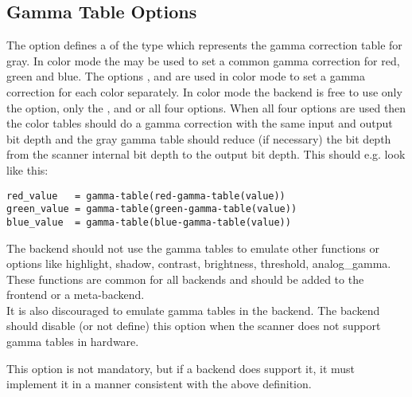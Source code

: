 \documentclass[11pt,DVIps]{report}
\begin{document}
\begin{changebar}
\subsection{Gamma Table Options}
The  option defines a 
of the type  which represents the gamma correction
table for gray.  In color mode the  may be used to set
a common gamma correction for red, green and blue. The options
,  and 
are used in color mode to set a gamma correction for each color
separately. In color mode the backend is free to use only the
 option, only the ,  and
 or all four options. When all four options
are used then the color tables should do a gamma correction with
the same input and output bit depth and the gray gamma table should
reduce (if necessary) the bit depth from the scanner internal
bit depth to the output bit depth. This should e.g. look like this:
\begin{verbatim}
red_value   = gamma-table(red-gamma-table(value))
green_value = gamma-table(green-gamma-table(value))
blue_value  = gamma-table(blue-gamma-table(value))
\end{verbatim}

The backend should not use the gamma tables to emulate other functions or options
like highlight, shadow, contrast, brightness, threshold, analog\_gamma.
These functions are common for all backends and should be added to the frontend
or a meta-backend.\\

It is also discouraged to emulate gamma tables in the backend. The backend
should disable (or not define) this option when the scanner does not support
gamma tables in hardware.
 
This option is not mandatory, but if a backend does support it, it
must implement it in a manner consistent with the above definition.\\
\end{changebar}
\end{document}
